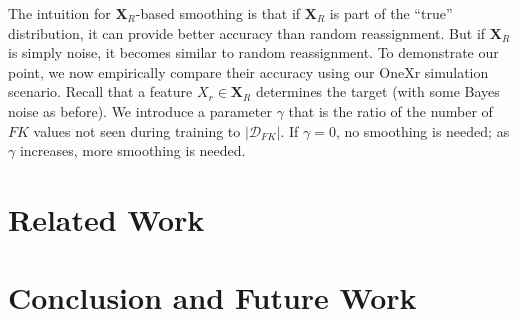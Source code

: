 \documentclass[sigconf]{acmart}
\begin{document}
The intuition for $\textbf{X}_R$-based smoothing is that if $\textbf{X}_R$ is part of the ``true'' distribution, it can provide better accuracy 
than random reassignment. But if $\textbf{X}_R$ is simply noise, it becomes similar to random reassignment.
To demonstrate our point, we now empirically compare their accuracy using our OneXr simulation scenario. Recall that a feature $X_r \in \textbf{X}_R$
determines the target (with some Bayes noise as before). We introduce a parameter $\gamma$ that is the ratio of the number of $FK$ values not seen 
during training to $|\mathcal{D}_{FK}|$. If $\gamma = 0$, no smoothing is needed; as $\gamma$ increases, more smoothing is needed.



\section{Related Work}

\section{Conclusion and Future Work}



\end{document}

